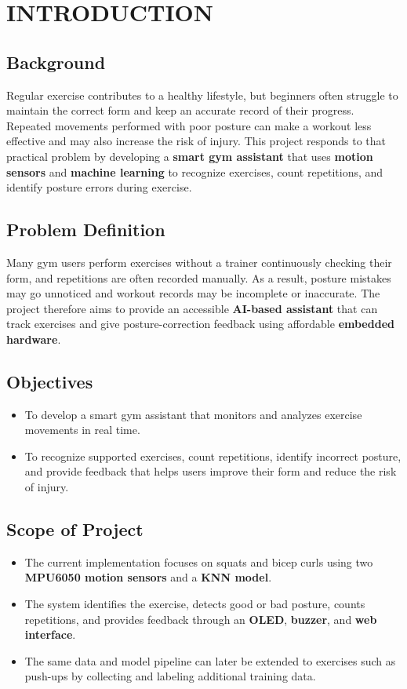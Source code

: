 \chapter{INTRODUCTION}
\section{Background}
Regular exercise contributes to a healthy lifestyle, but beginners often struggle to
maintain the correct form and keep an accurate record of their progress. Repeated
movements performed with poor posture can make a workout less effective and may also
increase the risk of injury. This project responds to that practical problem by
developing a \textbf{smart gym assistant} that uses \textbf{motion sensors} and
\textbf{machine learning} to recognize exercises, count repetitions, and identify
posture errors during exercise.


\section{Problem Definition}
Many gym users perform exercises without a trainer continuously checking their form,
and repetitions are often recorded manually. As a result, posture mistakes may go
unnoticed and workout records may be incomplete or inaccurate. The project therefore
aims to provide an accessible \textbf{AI-based assistant} that can track exercises
and give posture-correction feedback using affordable \textbf{embedded hardware}.


\section{Objectives}
\begin{itemize}
  \item To develop a smart gym assistant that monitors and analyzes exercise movements in real time.
  \item To recognize supported exercises, count repetitions, identify incorrect posture, and provide feedback that helps users improve their form and reduce the risk of injury.
\end{itemize}

\section{Scope of Project}
\begin{itemize}
  \item The current implementation focuses on squats and bicep curls using two \textbf{MPU6050 motion sensors} and a \textbf{KNN model}.
  \item The system identifies the exercise, detects good or bad posture, counts repetitions, and provides feedback through an \textbf{OLED}, \textbf{buzzer}, and \textbf{web interface}.
  \item The same data and model pipeline can later be extended to exercises such as push-ups by collecting and labeling additional training data.
\end{itemize}
